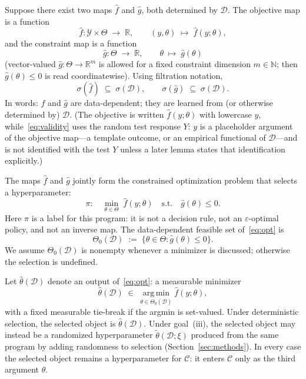 \documentclass[12pt]{article}
\theoremstyle{plain}
\begin{document}
\label{def:fhat-ghat}
Suppose there exist two maps $\hat f$ and $\hat g$, both determined by $\mathcal{D}$.
The objective map is a function
\[
\hat f
:
\mathcal{Y}\times\Theta
\;\longrightarrow\;
\mathbb{R},
\qquad
(y,\theta)\;\longmapsto\;\hat f(y;\theta),
\]
and the constraint map is a function
\[
\hat g
:
\Theta
\;\longrightarrow\;
\mathbb{R},
\qquad
\theta\;\longmapsto\;\hat g(\theta)
\]
(vector-valued $\hat g:\Theta\to\mathbb{R}^{m}$ is allowed for a fixed constraint dimension $m\in\mathbb{N}$; then $\hat g(\theta)\le 0$ is read coordinatewise).
Using filtration notation,
\begin{equation}
  \label{eq:filtration}
  \sigma(\hat f)\;\subseteq\;\sigma(\mathcal{D}),
  \qquad
  \sigma(\hat g)\;\subseteq\;\sigma(\mathcal{D}).
\end{equation}
In words: $\hat f$ and $\hat g$ are data-dependent; they are learned from (or otherwise determined by) $\mathcal{D}$.
\label{rem:y-vs-Y}
(The objective is written $\hat f(y;\theta)$ with lowercase $y$, while~\eqref{eq:validity} uses the random test response $Y$: $y$ is a placeholder argument of the objective map---a template outcome, or an empirical functional of $\mathcal{D}$---and is not identified with the test $Y$ unless a later lemma states that identification explicitly.)

\label{def:pi}
The maps $\hat f$ and $\hat g$ jointly form the constrained optimization problem that selects a hyperparameter:
\begin{equation}
    \label{eq:opt}
    \pi:
    \quad
    \min_{\theta\in\Theta}
    \;
    \hat f(y;\theta)
    \quad
    \text{s.t.}
    \quad
    \hat g(\theta)\le 0.
\end{equation}
Here $\pi$ is a label for this program: it is not a decision rule, not an $\varepsilon$-optimal policy, and not an inverse map.
\label{def:feasible}
The data-dependent feasible set of~\eqref{eq:opt} is
\[
\Theta_0(\mathcal{D})
\;:=\;
\bigl\{\theta\in\Theta:\hat g(\theta)\le 0\bigr\}.
\]
We assume $\Theta_0(\mathcal{D})$ is nonempty whenever a minimizer is discussed; otherwise the selection is undefined.

\label{def:thetahat}
Let $\hat\theta(\mathcal{D})$ denote an output of~\eqref{eq:opt}: a measurable minimizer
\[
\hat\theta(\mathcal{D})
\;\in\;
\operatorname*{arg\,min}_{\theta\in\Theta_0(\mathcal{D})}
\hat f(y;\theta),
\]
with a fixed measurable tie-break if the argmin is set-valued.
Under deterministic selection, the selected object is $\hat\theta(\mathcal{D})$.
Under goal~(iii), the selected object may instead be a randomized hyperparameter $\widetilde\theta(\mathcal{D};\xi)$ produced from the same program by adding randomness to selection (Section~\ref{sec:methods}).
In every case the selected object remains a hyperparameter for $\mathcal{C}$: it enters $\mathcal{C}$ only as the third argument $\theta$.
\end{document}
